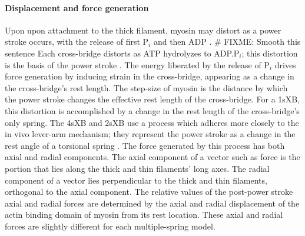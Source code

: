 \documentclass[]{article}
\begin{document}
\paragraph{Displacement and force generation} %
Upon upon attachment to the thick filament, myosin may distort as a power stroke occurs, with the release of first P$_i$ and then ADP  \citep{Pate1989, Daniel1998, Tanner2007}.  # FIXME: Smooth this sentence 
Each cross-bridge distorts as ATP hydrolyzes to ADP.P$_i$; this distortion is the basis of the power stroke \citep{Pate1989, Daniel1998, Tanner2007}. 
The energy liberated by the release of P$_i$ drives force generation by inducing strain in the cross-bridge, appearing as a change in the cross-bridge's rest length.  
The step-size of myosin is the distance by which the power stroke changes the effective rest length of the cross-bridge.  
For a 1sXB, this distortion is accomplished by a change in the rest length of the cross-bridge's only spring. 
The 4sXB and 2sXB use a process which adheres more closely to the in vivo lever-arm mechanism; they represent the power stroke as a change in the rest angle of a torsional spring \citep{Reedy2000}.
The force generated by this process has both axial and radial components. 
The axial component of a vector such as force is the portion that lies along the thick and thin filaments' long axes. 
The radial component of a vector lies perpendicular to the thick and thin filaments, orthogonal to the axial component. 
The relative values of the post-power stroke axial and radial forces are determined by the axial and radial displacement of the actin binding domain of myosin from its rest location.
These axial and radial forces are slightly different for each multiple-spring model. 
\end{document}
